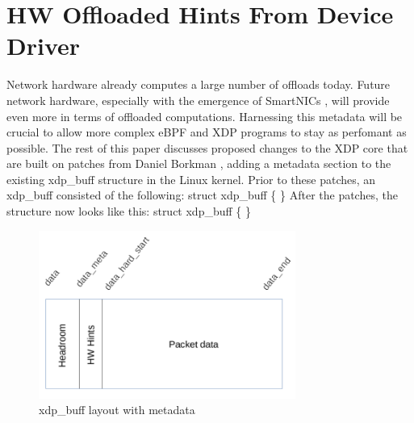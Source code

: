 \documentclass[letterpaper]{article}
\begin{document}
\section{HW Offloaded Hints From Device Driver} 

Network hardware already computes a large number of offloads today. Future network hardware, especially with the emergence of SmartNICs \cite{smartnic2016}, will provide even more in terms of offloaded computations. Harnessing this metadata will be crucial to allow more complex eBPF and XDP programs to stay as perfomant as possible.
\newline
\newline
The rest of this paper discusses proposed changes to the XDP core that are built on patches from Daniel Borkman \cite{borkmann2017}, adding a metadata section to the existing xdp\_buff structure in the Linux kernel. Prior to these patches, an xdp\_buff consisted of the following:
\newline
\newline
struct xdp\_buff \{
\newline
{}
\newline
{}
\newline
{}
\newline
\}
\newline
\newline
After the patches, the structure now looks like this:
\newline
\newline
struct xdp\_buff \{
\newline
{}
\newline
{}
\newline
{}
\newline
{}
\newline
\}
\newline

\begin{figure}[h]
\includegraphics[width=3.31in]{xdp-metadata-layout.png}
\caption{xdp\_buff layout with metadata}
\label{xdp-metadata-layout}
\end{figure}
\end{document}
